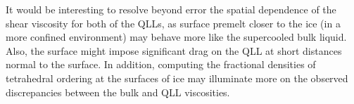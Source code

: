 It would be interesting to resolve beyond error the spatial dependence
of the shear viscosity for both of the QLLs, as surface premelt closer
to the ice (in a more confined environment) may behave more like
the supercooled bulk liquid. Also, the surface might impose significant
drag on the QLL at short distances normal to the surface. In addition,
computing the fractional densities of tetrahedral ordering at the
surfaces of ice may illuminate more on the observed discrepancies
between the bulk and QLL viscosities. 









